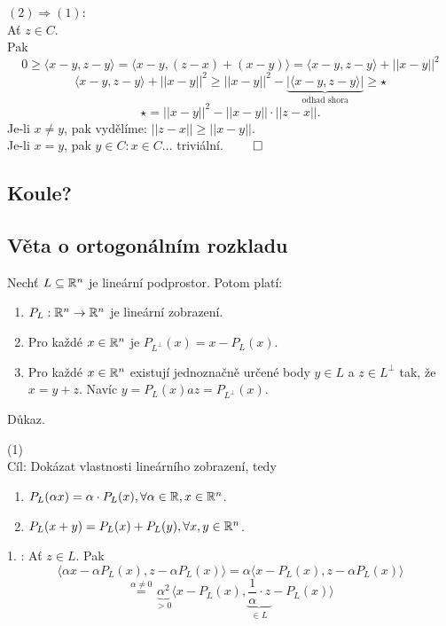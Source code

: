 $(2) \Rightarrow (1)$:\\
Ať $z \in C$.\\
Pak
\[
    0 \geq \langle x-y, z-y \rangle = \langle x-y, (z-x)+(x-y) \rangle = \langle x-y, z-y \rangle + ||x-y||^2  
\]
\[
    \langle x-y, z-y \rangle + ||x-y||^2 \geq  ||x-y||^2 - \underbrace{|\langle x-y, z-y\rangle|}_{\text{odhad shora}} \geq \star
\]
\[
    \star = ||x-y||^2 - ||x-y|| \cdot ||z-x||.
\]
Je-li $x \not= y$, pak vydělíme: $||z-x|| \geq ||x-y||$.\\
Je-li $x=y$, pak $y \in C : x \in C \dots$ triviální. $\qed$ 

\subsection{Koule?} %


\subsection{Věta o ortogonálním rozkladu}

Nechť $L \subseteq \mathbb{R}^n$ je lineární podprostor. Potom platí:

\begin{enumerate}[(1)]
    \item $P_L : \mathbb{R}^n \rightarrow \mathbb{R}^n$ je lineární zobrazení.
    \item Pro každé $x \in \mathbb{R}^n$ je $P_{L^\perp} (x) = x - P_L (x)$.
    \item Pro každé $x \in \mathbb{R}^n$ existují jednoznačně určené body $y \in L$ a $z \in L^\perp$ tak, že $x=y + z$. Navíc 
    $y = P_L(x) a z=P_{L^ \perp} (x)$.
\end{enumerate}

Důkaz.

(1)\\
Cíl: Dokázat vlastnosti lineárního zobrazení, tedy 
\begin{enumerate}
    \item $P_L (\alpha x) = \alpha \cdot P_L (x), \forall \alpha \in \mathbb{R}, x \in \mathbb{R}^n$.
    \item $P_L (x + y) =   P_L (x) +  P_L (y), \forall x,y \in \mathbb{R}^n$.
\end{enumerate}

1. : Ať $z \in L$.
Pak 
\[
    \langle \alpha x - \alpha P_L (x), z - \alpha P_L (x) \rangle = \alpha  \langle x - P_L (x), z - \alpha P_L (x)\rangle
\]
\[
    \stackrel{\alpha \not= 0}{=} \underbrace{\alpha^2}_{> 0} \langle x - P_L (x), \underbrace{\frac{1}{\alpha} 
    \cdot z}_{\in L} - P_L (x)\rangle
\]
